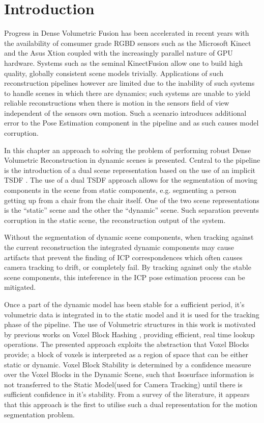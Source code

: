 
\section{Introduction}
\label{sec: moseg_introduction}
Progress in Dense Volumetric Fusion has been accelerated in recent years with
the availability of comsumer grade RGBD sensors such as the Microsoft Kinect and
the Asus Xtion coupled with the increasingly parallel nature of GPU hardware.
Systems such as the seminal KinectFusion \cite{Newcombe2011} allow one to build
high quality, globally consistent scene models trivially. Applications of such
reconstruction pipelines however are limited due to the inability of such
systems to handle scenes in which there are dynamics; such systems are unable
to yield reliable reconstructions when there is motion in the sensors field
of view independent of the sensors own motion. Such a scenario introduces
additional error to the Pose Estimation component in the pipeline and as such
causes model corruption.

In this chapter an approach to solving the problem of performing robust
Dense Volumetric Reconstruction in dynamic scenes is presented. Central to the
pipeline is the introduction of a dual scene representation based on the use
of an implicit TSDF \cite{Curless1996}. The use of a dual TSDF approach allows
for the segmentation of moving components in the scene from static components,
e.g. segmenting a person getting up from a chair from the chair itself. One of
the two scene representations is the ``static'' scene and the other the
``dynamic'' scene. Such separation prevents corruption in the static scene,
the reconstruction output of the system.

Without the segmentation of dynamic scene components, when tracking against the
current reconstruction the integrated dynamic components may cause artifacts
that prevent the finding of ICP correspondences which often causes camera
tracking to drift, or completely fail. By tracking against only the stable
scene components, this inteference in the ICP pose estimation process can be
mitigated.

Once a part of the dynamic model has been stable for a sufficient period, it's
volumetric data is integrated in to the static model and it is used for the
tracking phase of the pipeline. The use of Volumetric structures in this work
is motivated by previous works on Voxel Block Hashing \cite{NieBner2013},
providing efficient, real time lookup operations. The presented approach
exploits the abstraction that Voxel Blocks provide; a block of voxels is
interpreted as a region of space that can be either static or dynamic.
Voxel Block Stability is determined by a confidence measure over the Voxel
Blocks in the Dynamic Scene, such that Isosurface information is not transferred
to the Static Model(used for Camera Tracking) until there is sufficient
confidence in it's stability.
From a survey of the literature, it appears that this approach is the first to
utilise such a dual representation for the motion segmentation problem.

